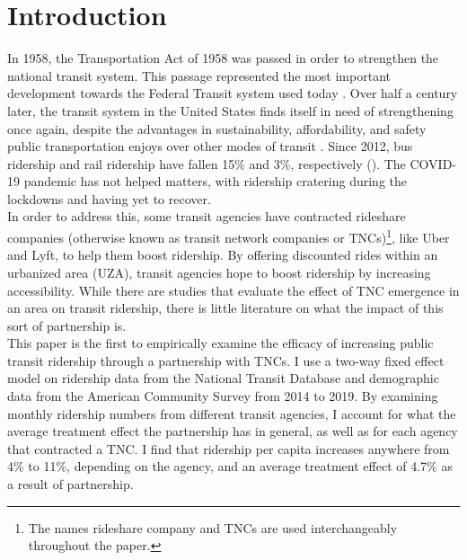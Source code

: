 \documentclass [12pt]{report}
\begin{document}
\section*{Introduction}
In 1958, the Transportation Act of 1958 was passed in order to strengthen the national transit system. This passage represented the most important development towards the Federal Transit system used today \parencite{ftaweb}. Over half a century later, the transit system in the United States finds itself in need of strengthening once again, despite the advantages in sustainability, affordability, and safety public transportation enjoys over other modes of transit \parencite{atpafact}. Since 2012, bus ridership and rail ridership have fallen 15\% and 3\%, respectively (\cite{erhardt22}). The COVID-19 pandemic has not helped matters, with ridership cratering during the lockdowns and having yet to recover. \\
\indent In order to address this, some transit agencies have contracted rideshare companies (otherwise known as transit network companies or TNCs)\footnote{The names rideshare company and TNCs are used interchangeably throughout the paper.}, like Uber and Lyft, to help them boost ridership. By offering discounted rides within an urbanized area (UZA), transit agencies hope to boost ridership by increasing accessibility. While there are studies that evaluate the effect of TNC emergence in an area on transit ridership, there is little literature on what the impact of this sort of partnership is.\\
\indent This paper is the first to empirically examine the efficacy of increasing public transit ridership through a partnership with
TNCs. I use a two-way fixed effect model on ridership data from the National Transit Database and demographic data from the American Community Survey from 2014 to 2019. By examining monthly ridership numbers from different transit agencies, I account for what the average treatment effect the partnership has in general, as well as for each agency that contracted a TNC. I find that ridership per capita increases anywhere from 4\% to 11\%, depending on the agency, and an average treatment effect of 4.7\% as a result of partnership.

\end{document}
